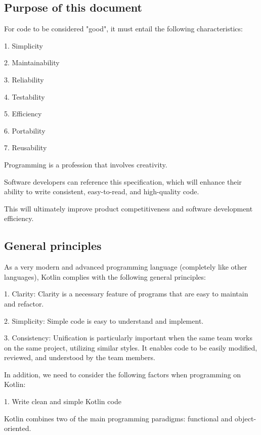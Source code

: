 \subsection*{\textbf{Purpose of this document}}



For code to be considered "good", it must entail the following characteristics:

1.	Simplicity

2.	Maintainability

3.	Reliability

4.	Testability

5.	Efficiency

6.	Portability

7.	Reusability



Programming is a profession that involves creativity.

Software developers can reference this specification, which will enhance their ability to write consistent, easy-to-read, and high-quality code.

This will ultimately improve product competitiveness and software development efficiency.



\subsection*{\textbf{General principles}}



As a very modern and advanced programming language (completely like other languages), Kotlin complies with the following general principles:

1.	Clarity: Clarity is a necessary feature of programs that are easy to maintain and refactor.

2.	Simplicity: Simple code is easy to understand and implement.

3.	Consistency: Unification is particularly important when the same team works on the same project, utilizing similar styles. It enables code to be easily modified, reviewed, and understood by the team members.



In addition, we need to consider the following factors when programming on Kotlin:



1. Write clean and simple Kotlin code



    Kotlin combines two of the main programming paradigms: functional and object-oriented.

